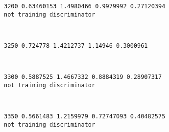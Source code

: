 \documentclass[11pt]{article}
\begin{document}
    \begin{Verbatim}[commandchars=\\\{\}]
3200 0.63460153 1.4980466 0.9979992 0.27120394
not training discriminator

    \end{Verbatim}

    \begin{center}
    \end{center}
    { \hspace*{\fill} \\}
    
    \begin{Verbatim}[commandchars=\\\{\}]
3250 0.724778 1.4212737 1.14946 0.3000961

    \end{Verbatim}

    \begin{center}
    \end{center}
    { \hspace*{\fill} \\}
    
    \begin{Verbatim}[commandchars=\\\{\}]
3300 0.5887525 1.4667332 0.8884319 0.28907317
not training discriminator

    \end{Verbatim}

    \begin{center}
    \end{center}
    { \hspace*{\fill} \\}
    
    \begin{Verbatim}[commandchars=\\\{\}]
3350 0.5661483 1.2159979 0.72747093 0.40482575
not training discriminator

    \end{Verbatim}

    \begin{center}
    \end{center}
    { \hspace*{\fill} \\}
    
\end{document}
